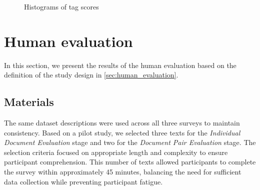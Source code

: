 \begin{figure}[h]
    \centering
    \hfill
    \caption{Histograms of tag scores}
    \label{fig:histograms_scores}
\end{figure}

\section{Human evaluation}
In this section, we present the results of the human evaluation based on the definition of the study design in \cref{sec:human_evaluation}.

\subsection{Materials}
The same dataset descriptions were used across all three surveys to maintain consistency. Based on a pilot study, we selected three texts for the \textit{Individual Document Evaluation} stage and two for the \textit{Document Pair Evaluation} stage. The selection criteria focused on appropriate length and complexity to ensure participant comprehension. This number of texts allowed participants to complete the survey within approximately 45 minutes, balancing the need for sufficient data collection while preventing participant fatigue.

